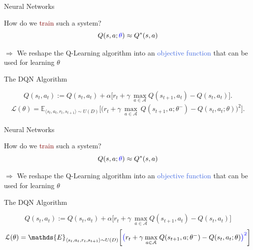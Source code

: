 \documentclass{beamer}
\begin{document}
\begin{frame}{Neural Networks}
	\begin{center}
		How do we \textcolor{Maroon}{train} such a system?
		\begin{equation*}  
			Q(s,a; \textcolor{blue}{\theta})\approx Q^{*}(s,a)
		\end{equation*}
	\end{center}

	$\Rightarrow$ We reshape the Q-Learning algorithm into an \textcolor{RoyalBlue}{objective function} that can be used for learning $\theta$

	\begin{block}{The DQN Algorithm}
		
		\begin{equation*}
			Q(s_t,a_t):=Q(s_t,a_t) + \alpha\big[r_t + \gamma \:\underset{a\in \mathcal{A}}{\max} Q(s_{t+1},a_t) - Q(s_t, a_t) \big].
			\label{eq:q_learning}
		\end{equation*}
		\begin{multline*}
				\mathcal{L}(\theta) = \mathds{E}_{\langle s_{t},a_{t},r_{t},s_{t+1}\rangle\sim U(D)} \bigg[\big(r_{t} + \gamma \: \underset{a\in \mathcal{A}}{\max}\: Q(s_{t+1}, a; \theta^{-}) - Q(s_{t}, a_{t}; \theta)\big)^{2}\bigg].
		\end{multline*}
	\end{block}

\end{frame}


\begin{frame}{Neural Networks}
	\begin{center}
		How do we \textcolor{Maroon}{train} such a system?
		\begin{equation*}  
			Q(s,a; \textcolor{blue}{\theta})\approx Q^{*}(s,a)
		\end{equation*}
	\end{center}

	$\Rightarrow$ We reshape the Q-Learning algorithm into an \textcolor{RoyalBlue}{objective function} that can be used for learning $\theta$

	\begin{block}{The DQN Algorithm}
		
		\begin{equation*}
			Q(s_t,a_t):=Q(s_t,a_t) + \alpha\big[r_t + \gamma \:\underset{a\in \mathcal{A}}{\max} Q(s_{t+1},a_t) - Q(s_t, a_t) \big]
			\label{eq:q_learning}
		\end{equation*}
		\begin{multline*}
			\mathcal{L}(\theta) = \mathds{E}_{\langle s_{t},a_{t},r_{t},s_{t+1}\rangle\sim U(D)} \bigg[\textcolor{blue}{\big(}r_{t} + \gamma \: \underset{a\in \mathcal{A}}{\max}\: Q(s_{t+1}, a; \theta^{-}) - Q(s_{t}, a_{t}; \theta) \textcolor{blue}{\big)^{2}}\bigg]
		\end{multline*}
	\end{block}
\end{frame}
\end{document}
